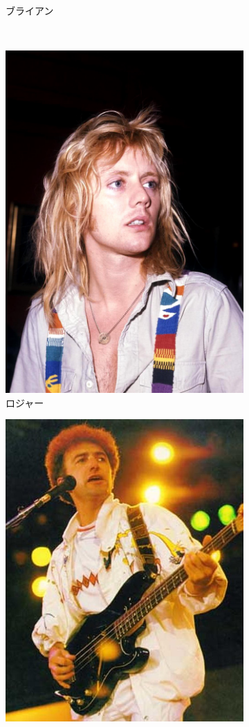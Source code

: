 \documentclass[a4j, twocolumn]{jarticle}
\begin{document}
\begin{figure}[htb]
\begin{subfigure}[b]{0.15\textwidth}
      \vspace{-1.0mm}
      \caption{ブライアン}
      \label{brianimg}
  \end{subfigure}
  \\
  \begin{subfigure}[b]{0.15\textwidth}
    \centering
    \includegraphics[height=\textwidth]{Roger.jpg}
    \vspace{-1.0mm}
    \caption{ロジャー}
    \label{rogerimg}
  \end{subfigure}
  \begin{subfigure}[b]{0.15\textwidth}
    \centering
    \includegraphics[height=\textwidth]{John.jpg}

\end{subfigure}
\end{figure}
\end{document}
